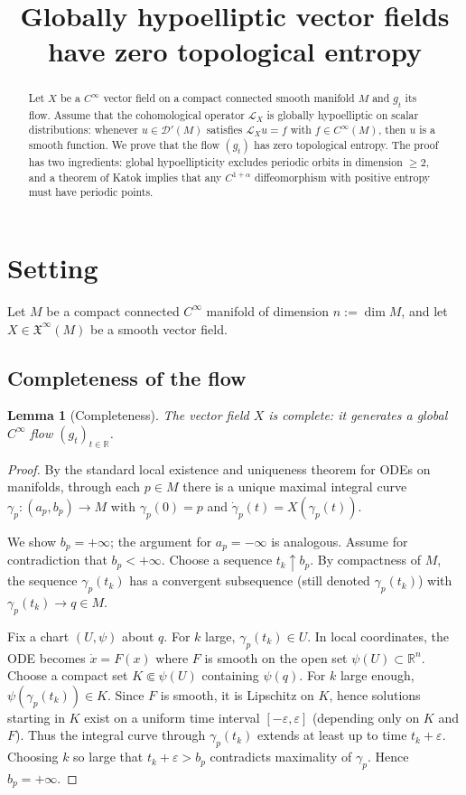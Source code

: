 \documentclass[11pt]{article}
\newtheorem{lemma}[theorem]{Lemma}
\theoremstyle{definition}
\theoremstyle{remark}
\newcommand{\Lie}{\mathcal{L}}
\newcommand{\D}{\mathscr{D}}
\newcommand{\R}{\mathbb{R}}
\begin{document}
\title{Globally hypoelliptic vector fields have zero topological entropy}
\author{}
\date{}
\maketitle

\begin{abstract}
Let $X$ be a $C^\infty$ vector field on a compact connected smooth manifold $M$ and $g_t$ its flow.
Assume that the cohomological operator $\Lie_X$ is globally hypoelliptic on scalar distributions: whenever $u\in\D'(M)$ satisfies $\Lie_X u=f$ with $f\in C^\infty(M)$, then $u$ is a smooth function.
We prove that the flow $(g_t)$ has zero topological entropy.
The proof has two ingredients: global hypoellipticity excludes periodic orbits in dimension $\ge 2$, and a theorem of Katok implies that any $C^{1+\alpha}$ diffeomorphism with positive entropy must have periodic points.
\end{abstract}

\section{Setting}

Let $M$ be a compact connected $C^\infty$ manifold of dimension $n:=\dim M$, and let
$X\in\mathfrak{X}^\infty(M)$ be a smooth vector field.

\subsection{Completeness of the flow}

\begin{lemma}[Completeness]\label{lem:complete}
The vector field $X$ is complete: it generates a global $C^\infty$ flow $(g_t)_{t\in\R}$.
\end{lemma}

\begin{proof}
By the standard local existence and uniqueness theorem for ODEs on manifolds, through each $p\in M$
there is a unique maximal integral curve $\gamma_p:(a_p,b_p)\to M$ with $\gamma_p(0)=p$ and
$\dot{\gamma}_p(t)=X(\gamma_p(t))$.

We show $b_p=+\infty$; the argument for $a_p=-\infty$ is analogous.
Assume for contradiction that $b_p<+\infty$.
Choose a sequence $t_k\uparrow b_p$.
By compactness of $M$, the sequence $\gamma_p(t_k)$ has a convergent subsequence
(still denoted $\gamma_p(t_k)$) with $\gamma_p(t_k)\to q\in M$.

Fix a chart $(U,\psi)$ about $q$.
For $k$ large, $\gamma_p(t_k)\in U$.
In local coordinates, the ODE becomes $\dot{x}=F(x)$ where $F$ is smooth on the open set $\psi(U)\subset\R^n$.
Choose a compact set $K\Subset \psi(U)$ containing $\psi(q)$.
For $k$ large enough, $\psi(\gamma_p(t_k))\in K$.
Since $F$ is smooth, it is Lipschitz on $K$, hence solutions starting in $K$ exist on a uniform time interval
$[-\varepsilon,\varepsilon]$ (depending only on $K$ and $F$).
Thus the integral curve through $\gamma_p(t_k)$ extends at least up to time $t_k+\varepsilon$.
Choosing $k$ so large that $t_k+\varepsilon>b_p$ contradicts maximality of $\gamma_p$.
Hence $b_p=+\infty$.
\end{proof}
\end{document}
